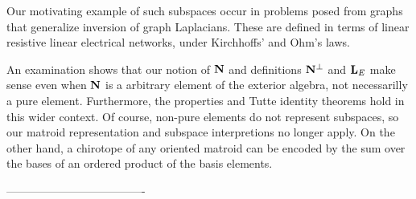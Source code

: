 Our motivating example of such subspaces occur
in problems posed from graphs that generalize inversion
of graph Laplacians.  These are defined in
terms of linear resistive linear electrical networks,
under Kirchhoffs' and Ohm's laws.





An examination shows that our notion of  $\mathbf{N}$ and definitions $\mathbf{N}^\perp$ and $\mathbf{L}_E$ make
sense even when $\mathbf{N}$ is a arbitrary element of the exterior algebra, not necessarilly a pure element.
Furthermore, the properties and Tutte identity theorems hold in this wider context.   Of course,
non-pure elements do not represent subspaces, so our matroid representation and subspace
interpretions no longer apply.  On the other hand, a chirotope of any oriented matroid can be encoded by
the sum over the bases of an ordered product of the basis elements.



-------------------------------------

